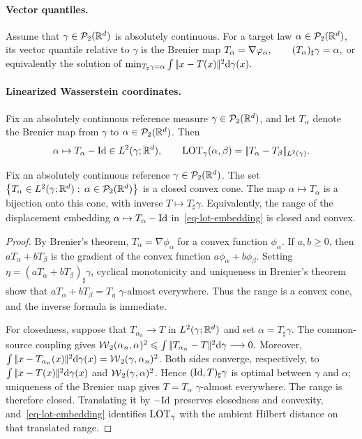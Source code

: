 \paragraph{Vector quantiles.}
Assume that $\gamma\in\mathcal{P}_2(\mathbb{R}^d)$ is absolutely continuous. For a target law $\alpha\in\mathcal{P}_2(\mathbb{R}^d)$, its vector quantile relative to $\gamma$ is the Brenier map
\(T_\alpha=\nabla\varphi_\alpha, \qquad (T_\alpha)_\sharp\gamma=\alpha,\)
or equivalently the solution of
\(\min_{T_\sharp\gamma=\alpha} \int |\!| x-T(x) |\!|^2\mathrm{d}\gamma(x).\)
\paragraph{Linearized Wasserstein coordinates.}
\begin{defn}\label{def-lot-embedding}
Fix an absolutely continuous reference measure $\gamma\in\mathcal{P}_2(\mathbb{R}^d)$, and let $T_\alpha$ denote the Brenier map from $\gamma$ to $\alpha\in\mathcal{P}_2(\mathbb{R}^d)$. Then
\begin{equation}\label{eq-lot-embedding}
\alpha \mapsto T_\alpha-\mathrm{Id}\in L^2(\gamma;\mathbb{R}^d),
\qquad
\operatorname{LOT}_\gamma(\alpha,\beta)=|\!| T_\alpha-T_\beta |\!|_{L^2(\gamma)}.
\end{equation}
\end{defn}
\begin{prop}\label{prop-lot-closed-convex-range}
Fix an absolutely continuous reference $\gamma\in\mathcal{P}_2(\mathbb{R}^d)$. The set
\(\left\{ T_\alpha\in L^2(\gamma;\mathbb{R}^d) \;;\; \alpha\in\mathcal{P}_2(\mathbb{R}^d) \right\}\)
is a closed convex cone. The map $\alpha\mapsto T_\alpha$ is a bijection onto this cone, with inverse $T\mapsto T_\sharp\gamma$. Equivalently, the range of the displacement embedding $\alpha\mapsto T_\alpha-\mathrm{Id}$ in~\eqref{eq-lot-embedding} is closed and convex.
\end{prop}
\begin{proof}
By Brenier's theorem, $T_\alpha=\nabla\phi_\alpha$ for a convex function $\phi_\alpha$. If $a,b\geq0$, then $aT_\alpha+bT_\beta$ is the gradient of the convex function $a\phi_\alpha+b\phi_\beta$. Setting $\eta=(aT_\alpha+bT_\beta)_\sharp\gamma$, cyclical monotonicity and uniqueness in Brenier's theorem show that $aT_\alpha+bT_\beta=T_\eta$ $\gamma$-almost everywhere. Thus the range is a convex cone, and the inverse formula is immediate.

For closedness, suppose that $T_{\alpha_n}\to T$ in $L^2(\gamma;\mathbb{R}^d)$ and set $\alpha=T_\sharp\gamma$. The common-source coupling gives \(\operatorname{\mathcal{W}}_2(\alpha_n,\alpha)^2 \leqslant \int|\!| T_{\alpha_n}-T |\!|^2\mathrm{d}\gamma \longrightarrow0.\)
Moreover,
$\int|\!| x-T_{\alpha_n}(x) |\!|^2\mathrm{d}\gamma(x)=\operatorname{\mathcal{W}}_2(\gamma,\alpha_n)^2$.
Both sides converge, respectively, to
$\int|\!| x-T(x) |\!|^2\mathrm{d}\gamma(x)$ and $\operatorname{\mathcal{W}}_2(\gamma,\alpha)^2$.
Hence $(\mathrm{Id},T)_\sharp\gamma$ is optimal between $\gamma$ and $\alpha$; uniqueness of the Brenier map gives $T=T_\alpha$ $\gamma$-almost everywhere. The range is therefore closed. Translating it by $-\mathrm{Id}$ preserves closedness and convexity, and~\eqref{eq-lot-embedding} identifies $\operatorname{LOT}_\gamma$ with the ambient Hilbert distance on that translated range.
\end{proof}
